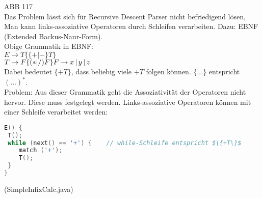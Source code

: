 ABB 117\\
Das Problem lässt sich für Recursive Descent Parser nicht befriedigend lösen, Man kann links-assoziative Operatoren durch Schleifen verarbeiten. Dazu: EBNF (Extended Backus-Naur-Form).\\
Obige Grammatik in EBNF:\\
$E\to T \{ \{+|-\} T \}$\\
$T \to F \{ (*|/)F\}\\
F \to x\,|\,y\,|\,z$\\
Dabei bedeutet $\{ +T \}$, dass beliebig viele $+T$ folgen können. $\{...\}$ entspricht $(...)^*$.\\
Problem: Aus dieser Grammatik geht die Assoziativität der Operatoren nicht hervor. Diese muss festgelegt werden. Links-assoziative Operatoren können mit einer Schleife verarbeitet werden:
\begin{lstlisting}[language=C]
E() {
 T();
 while (next() == '+') {	// while-Schleife entspricht $\{+T\}$
 	match ('+');
 	T();
 }
}
\end{lstlisting}
(SimpleInfixCalc.java)


